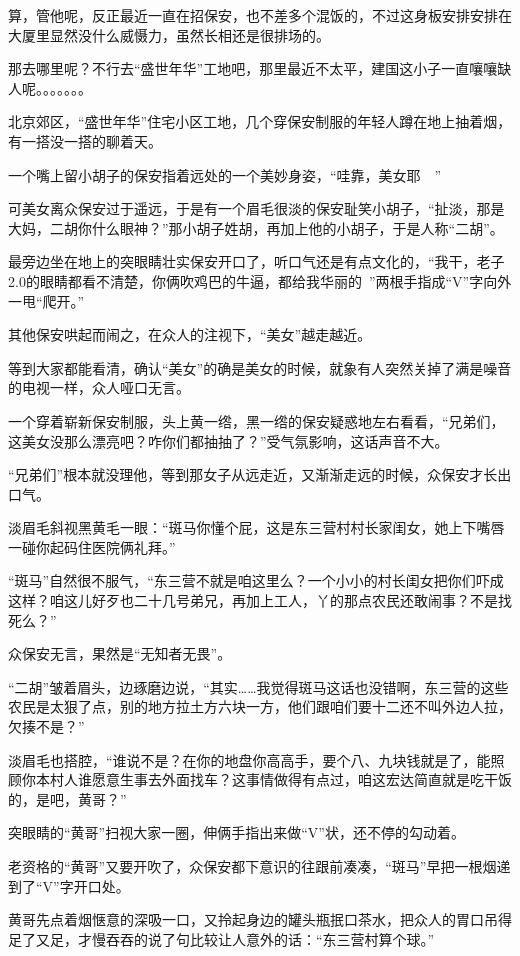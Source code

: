 算，管他呢，反正最近一直在招保安，也不差多个混饭的，不过这身板安排安排在大厦里显然没什么威慑力，虽然长相还是很排场的。

那去哪里呢？不行去“盛世年华”工地吧，那里最近不太平，建国这小子一直嚷嚷缺人呢。。。。。。。

北京郊区，“盛世年华”住宅小区工地，几个穿保安制服的年轻人蹲在地上抽着烟，有一搭没一搭的聊着天。

一个嘴上留小胡子的保安指着远处的一个美妙身姿，“哇靠，美女耶~~”

可美女离众保安过于遥远，于是有一个眉毛很淡的保安耻笑小胡子，“扯淡，那是大妈，二胡你什么眼神？”那小胡子姓胡，再加上他的小胡子，于是人称“二胡”。

最旁边坐在地上的突眼睛壮实保安开口了，听口气还是有点文化的，“我干，老子2.0的眼睛都看不清楚，你俩吹鸡巴的牛逼，都给我华丽的~”两根手指成“V”字向外一甩“爬开。”

其他保安哄起而闹之，在众人的注视下，“美女”越走越近。

等到大家都能看清，确认“美女”的确是美女的时候，就象有人突然关掉了满是噪音的电视一样，众人哑口无言。

一个穿着崭新保安制服，头上黄一绺，黑一绺的保安疑惑地左右看看，“兄弟们，这美女没那么漂亮吧？咋你们都抽抽了？”受气氛影响，这话声音不大。

“兄弟们”根本就没理他，等到那女子从远走近，又渐渐走远的时候，众保安才长出口气。

淡眉毛斜视黑黄毛一眼：“斑马你懂个屁，这是东三营村村长家闺女，她上下嘴唇一碰你起码住医院俩礼拜。”

“斑马”自然很不服气，“东三营不就是咱这里么？一个小小的村长闺女把你们吓成这样？咱这儿好歹也二十几号弟兄，再加上工人，丫的那点农民还敢闹事？不是找死么？”

众保安无言，果然是“无知者无畏”。

“二胡”皱着眉头，边琢磨边说，“其实……我觉得斑马这话也没错啊，东三营的这些农民是太狠了点，别的地方拉土方六块一方，他们跟咱们要十二还不叫外边人拉，欠揍不是？”

淡眉毛也搭腔，“谁说不是？在你的地盘你高高手，要个八、九块钱就是了，能照顾你本村人谁愿意生事去外面找车？这事情做得有点过，咱这宏达简直就是吃干饭的，是吧，黄哥？”

突眼睛的“黄哥”扫视大家一圈，伸俩手指出来做“V”状，还不停的勾动着。

老资格的“黄哥”又要开吹了，众保安都下意识的往跟前凑凑，“斑马”早把一根烟递到了“V”字开口处。

黄哥先点着烟惬意的深吸一口，又拎起身边的罐头瓶抿口茶水，把众人的胃口吊得足了又足，才慢吞吞的说了句比较让人意外的话：“东三营村算个球。”


